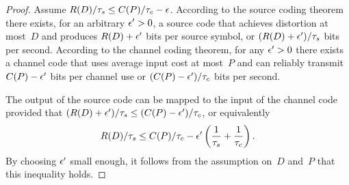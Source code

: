 \begin{subappendices}
\begin{proof}
  Assume $R(D)/{\tau_s} \le C(P)/{\tau_c} - \epsilon$. According to the source coding theorem
  there exists, for an arbitrary $\epsilon' > 0$, a source code that achieves
  distortion at most~$D$ and produces $R(D) + \epsilon'$ bits per source symbol, or
  $(R(D) + \epsilon')/{\tau_s}$ bits per second. According to the channel coding theorem,
  for any $\epsilon' > 0$ there exists a channel code that uses average input
  cost at most~$P$ and can reliably transmit $C(P) - \epsilon'$ bits per channel use
  or $(C(P) - \epsilon')/{\tau_c}$ bits per second.

  The output of the source code can be mapped to the input of the channel code
  provided that $(R(D) + \epsilon')/{\tau_s} \le (C(P) - \epsilon')/{\tau_c}$, 
  or equivalently
  \[ R(D)/{\tau_s} \le C(P)/{\tau_c} - \epsilon'\left(\frac{1}{{\tau_s}} + \frac{1}{{\tau_c}} \right). \]
  By choosing $\epsilon'$ small enough, it follows from the assumption on~$D$ and~$P$
  that this inequality holds.
\end{proof}


\end{subappendices}
